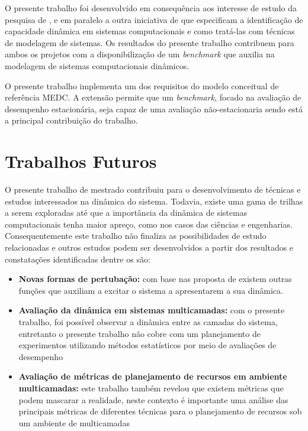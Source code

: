 O presente trabalho foi desenvolvido em consequência aos interesse de estudo da pesquisa de , e em paralelo a outra iniciativa de  que especificam a identificação de capacidade dinâmica em sistemas computacionais e como tratá-las com técnicas de modelagem de sistemas. Os resultados do presente trabalho contribuem para ambos os projetos com a disponibilização de um \textit{benchmark} que auxilia na modelagem de sistemas computacionais dinâmicos.

O presente trabalho implementa um dos requisitos do modelo conceitual de referência MEDC. A extensão permite que um \textit{benchmark}, focado na avaliação de desempenho estacionária, seja capaz de uma avaliação não-estacionaria sendo está a principal contribuição do trabalho.

\section{Trabalhos Futuros}
O presente trabalho de mestrado contribuiu para o desenvolvimento de técnicas e estudos interessados na dinâmica do sistema. Todavia, existe uma gama de trilhas a serem exploradas até que a importância da dinâmica de sistemas computacionais tenha maior apreço, como nos casos das ciências e engenharias. Consequentemente este trabalho não finaliza as possibilidades de estudo relacionadas e outros estudos podem ser desenvolvidos a partir dos resultados e constatações identificadas dentre os são:
\begin{itemize}
	\item \textbf{Novas formas de pertubação:} com base nas proposta de \cite{Hellerstein2004} existem outras funções que auxiliam a excitar o sistema a apresentarem a sua dinâmica. 
	
	\item \textbf{Avaliação da dinâmica em sistemas multicamadas:} com o presente trabalho, foi possível observar a dinâmica entre as camadas do sistema, entretanto o presente trabalho não cobre com um planejamento de experimentos utilizando métodos estatísticos por meio de avaliações de desempenho
	
	\item \textbf{Avaliação de métricas de planejamento de recursos em ambiente multicamadas:} este trabalho também revelou que existem métricas que podem mascarar a realidade, neste contexto é importante uma análise das principais métricas de diferentes técnicas para o planejamento de recursos sob um ambiente de multicamadas
\end{itemize} 	
